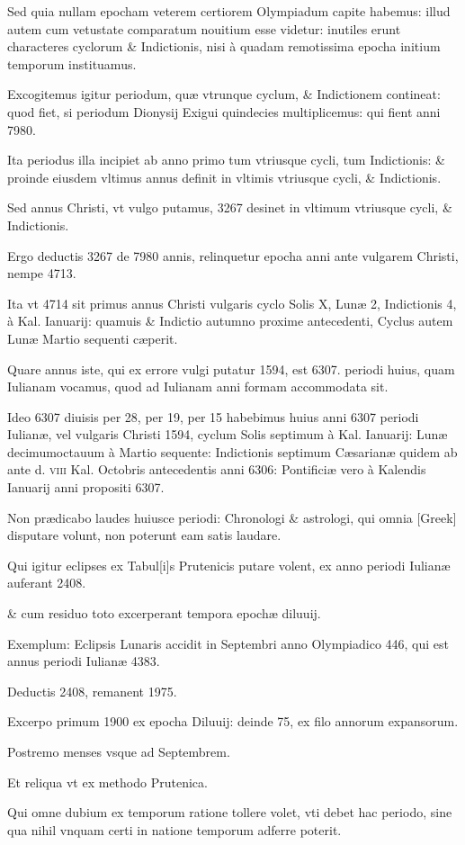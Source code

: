 \begin{parnumbers}

Sed quia nullam epocham
veterem certiorem Olympiadum capite habemus: illud autem 
cum vetustate comparatum nouitium esse videtur: inutiles erunt characteres
cyclorum \& Indictionis, nisi à quadam remotissima epocha
initium temporum instituamus.

Excogitemus igitur periodum,
quæ vtrunque cyclum, \& Indictionem contineat: quod fiet, si periodum
Dionysij Exigui quindecies multiplicemus: qui fient anni
7980.

Ita periodus illa incipiet ab anno primo tum vtriusque cycli,
tum Indictionis: \& proinde eiusdem vltimus annus definit in vltimis
vtriusque cycli, \& Indictionis.

Sed annus Christi, vt vulgo putamus,
3267 desinet in vltimum vtriusque cycli, \& Indictionis.

Ergo deductis
3267 de 7980 annis, relinquetur epocha anni ante vulgarem 
Christi, nempe 4713.

Ita vt 4714 sit primus annus Christi vulgaris cyclo
Solis \textsc{X}, Lunæ 2, Indictionis 4, à Kal. Ianuarij: quamuis \& Indictio
autumno proxime antecedenti, Cyclus autem Lunæ Martio sequenti
cæperit.

Quare annus iste, qui ex errore vulgi putatur 1594, est 6307.
periodi huius, quam Iulianam vocamus, quod ad Iulianam anni formam
accommodata sit.

Ideo 6307 diuisis per 28, per 19, per 15 habebimus
huius anni 6307 periodi Iulianæ, vel vulgaris Christi 1594, cyclum
Solis septimum à Kal. Ianuarij: Lunæ decimumoctauum à
Martio sequente: Indictionis septimum Cæsarianæ quidem ab ante d.
\textsc{viii} Kal. Octobris antecedentis anni 6306: Pontificiæ vero à
 Kalendis Ianuarij anni propositi 6307.

Non prædicabo laudes huiusce periodi:
Chronologi \& astrologi, qui omnia \textgreek{[Greek]} disputare volunt,
non poterunt eam satis laudare.

Qui igitur eclipses ex Tabul[i]s
Prutenicis putare volent, ex anno periodi Iulianæ auferant 2408.

\&
cum residuo toto excerperant tempora epochæ diluuij.

Exemplum: Eclipsis
Lunaris accidit in Septembri anno Olympiadico 446, qui est annus
periodi Iulianæ 4383.

Deductis 2408, remanent 1975.

Excerpo
primum 1900 ex epocha Diluuij: deinde 75, ex filo annorum expansorum.

Postremo menses vsque ad Septembrem.

Et reliqua vt ex methodo
Prutenica.

Qui omne dubium ex temporum ratione tollere
volet, vti debet hac periodo, sine qua nihil vnquam certi in natione
 temporum adferre poterit.

\end{parnumbers}
